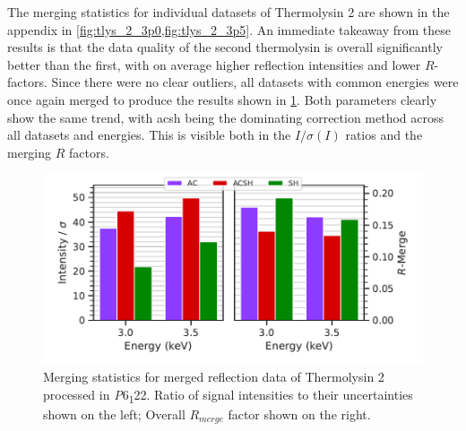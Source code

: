 
The merging statistics for individual datasets of Thermolysin 2 are shown in the appendix in \cref{fig:tlys_2_3p0,fig:tlys_2_3p5}. An immediate takeaway from these results is that the data quality of the second thermolysin is overall significantly better than the first, with on average higher reflection intensities and lower $R$-factors. Since there were no clear outliers, all datasets with common energies were once again merged to produce the results shown in \cref{fig:tlys_2_stats}. Both parameters clearly show the same trend, with \ac{acsh} being the dominating correction method across all datasets and energies. This is visible both in the $I/\sigma(I)$ ratios and the merging $R$ factors.


\begin{figure}
    \centering
    \includegraphics{plots/exp1/tlys_2_P6122/merged_stats.pdf}
    \caption{Merging statistics for merged reflection data of Thermolysin 2 processed in \textit{P}6\textsubscript{1}22. Ratio of signal intensities to their uncertainties shown on the left; Overall $R_{merge}$ factor shown on the right.}
    \label{fig:tlys_2_stats}
\end{figure}



